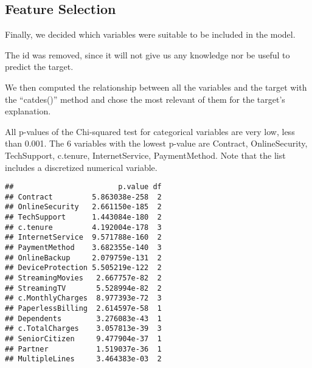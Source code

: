 \documentclass[
]{article}
\newenvironment{Shaded}{\begin{snugshade}}{\end{snugshade}}
\newcommand{\CommentTok}[1]{\textcolor[rgb]{0.56,0.35,0.01}{\textit{#1}}}
\newcommand{\ConstantTok}[1]{\textcolor[rgb]{0.56,0.35,0.01}{#1}}
\newcommand{\FunctionTok}[1]{\textcolor[rgb]{0.13,0.29,0.53}{\textbf{#1}}}
\newcommand{\NormalTok}[1]{#1}
\newcommand{\OtherTok}[1]{\textcolor[rgb]{0.56,0.35,0.01}{#1}}
\newcommand{\SpecialCharTok}[1]{\textcolor[rgb]{0.81,0.36,0.00}{\textbf{#1}}}
\newcommand{\StringTok}[1]{\textcolor[rgb]{0.31,0.60,0.02}{#1}}
\begin{document}
\hypertarget{feature-selection}{%
\subsection{Feature Selection}\label{feature-selection}}

Finally, we decided which variables were suitable to be included in the
model.

The id was removed, since it will not give us any knowledge nor be
useful to predict the target.

\begin{Shaded}
\end{Shaded}

We then computed the relationship between all the variables and the
target with the ``catdes()'' method and chose the most relevant of them
for the target's explanation.

All p-values of the Chi-squared test for categorical variables are very
low, less than 0.001. The 6 variables with the lowest p-value are
Contract, OnlineSecurity, TechSupport, c.tenure, InternetService,
PaymentMethod. Note that the list includes a discretized numerical
variable.

\begin{Shaded}
\end{Shaded}

\begin{verbatim}
##                        p.value df
## Contract         5.863038e-258  2
## OnlineSecurity   2.661150e-185  2
## TechSupport      1.443084e-180  2
## c.tenure         4.192004e-178  3
## InternetService  9.571788e-160  2
## PaymentMethod    3.682355e-140  3
## OnlineBackup     2.079759e-131  2
## DeviceProtection 5.505219e-122  2
## StreamingMovies   2.667757e-82  2
## StreamingTV       5.528994e-82  2
## c.MonthlyCharges  8.977393e-72  3
## PaperlessBilling  2.614597e-58  1
## Dependents        3.276083e-43  1
## c.TotalCharges    3.057813e-39  3
## SeniorCitizen     9.477904e-37  1
## Partner           1.519037e-36  1
## MultipleLines     3.464383e-03  2
\end{verbatim}
\end{document}
